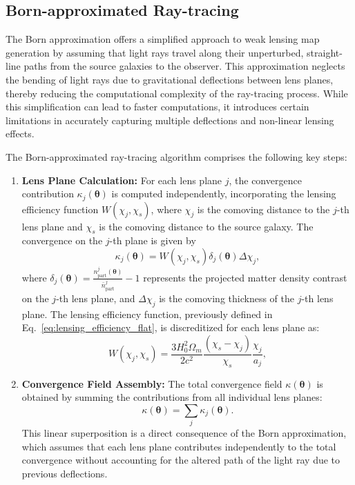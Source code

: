 \subsection{Born-approximated Ray-tracing}
The Born approximation offers a simplified approach to weak lensing map generation by assuming that light rays travel along their unperturbed, straight-line paths from the source galaxies to the observer. This approximation neglects the bending of light rays due to gravitational deflections between lens planes, thereby reducing the computational complexity of the ray-tracing process. While this simplification can lead to faster computations, it introduces certain limitations in accurately capturing multiple deflections and non-linear lensing effects.

The Born-approximated ray-tracing algorithm comprises the following key steps:

\begin{enumerate}
    \item \textbf{Lens Plane Calculation:} 
    For each lens plane $j$, the convergence contribution $\kappa_j(\boldsymbol{\theta})$ is computed independently, incorporating the lensing efficiency function $W(\chi_j, \chi_s)$, where $\chi_j$ is the comoving distance to the $j$-th lens plane and $\chi_s$ is the comoving distance to the source galaxy. The convergence on the $j$-th plane is given by
    \begin{equation}
        \kappa_j(\boldsymbol{\theta}) = W(\chi_j, \chi_s) \delta_j(\boldsymbol{\theta}) \Delta \chi_j,
        \label{eq:kappa_born}
    \end{equation}
    where $\delta_j(\boldsymbol{\theta}) = \frac{n_{\mathrm{part}}^j(\boldsymbol{\theta})}{\bar{n}_{\mathrm{part}}^j} - 1$ represents the projected matter density contrast on the $j$-th lens plane, and $\Delta \chi_j$ is the comoving thickness of the $j$-th lens plane. The lensing efficiency function, previously defined in Eq.~\eqref{eq:lensing_efficiency_flat}, is discreditized for each lens plane as:
    \begin{equation}
        W(\chi_j, \chi_s) = \frac{3 H_0^2 \Omega_m}{2 c^2} \frac{( \chi_s - \chi_j )}{ \chi_s } \frac{ \chi_j }{ a_j },
    \end{equation}

    \item \textbf{Convergence Field Assembly:} 
    The total convergence field $\kappa(\boldsymbol{\theta})$ is obtained by summing the contributions from all individual lens planes:
    \begin{equation}
        \kappa(\boldsymbol{\theta}) = \sum_{j} \kappa_j(\boldsymbol{\theta}).
        \label{eq:total_kappa}
    \end{equation}
    This linear superposition is a direct consequence of the Born approximation, which assumes that each lens plane contributes independently to the total convergence without accounting for the altered path of the light ray due to previous deflections.

\end{enumerate}
